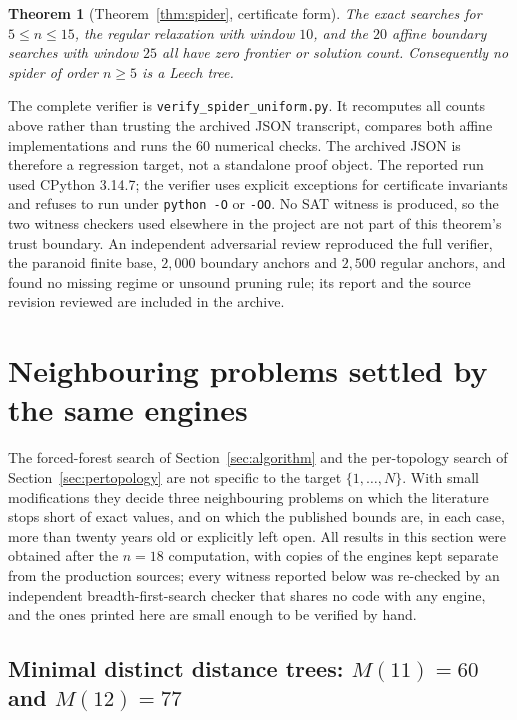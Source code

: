 \documentclass[11pt,a4paper]{article}
\theoremstyle{plain}
\newtheorem{theorem}{Theorem}[section]
\theoremstyle{remark}
\newcommand{\file}[1]{\texttt{#1}}
\begin{document}
\begin{theorem}[Theorem~\ref{thm:spider}, certificate form]
\label{thm:spiderquant}
The exact searches for $5\le n\le15$, the regular relaxation with window $10$,
and the $20$ affine boundary searches with window $25$ all have zero frontier
or solution count.  Consequently no spider of order $n\ge5$ is a Leech tree.
\end{theorem}

The complete verifier is \file{verify\_spider\_uniform.py}.  It recomputes all
counts above rather than trusting the archived JSON transcript, compares both
affine implementations and runs the $60$ numerical checks.  The archived JSON
is therefore a regression target, not a standalone proof object.  The reported
run used CPython 3.14.7; the verifier uses explicit exceptions for certificate
invariants and refuses to run under \file{python -O} or \file{-OO}.  No SAT
witness is produced, so the two witness checkers used elsewhere in the project
are not part of this theorem's trust boundary.  An independent adversarial
review reproduced the full verifier, the paranoid finite base, $2{,}000$
boundary anchors and $2{,}500$ regular anchors, and found no missing regime or
unsound pruning rule; its report and the source revision reviewed are included
in the archive.

\section{Neighbouring problems settled by the same engines}\label{sec:variants}

The forced-forest search of Section~\ref{sec:algorithm} and the per-topology
search of Section~\ref{sec:pertopology} are not specific to the target
$\{1,\dots,N\}$.  With small modifications they decide three neighbouring
problems on which the literature stops short of exact values, and on which
the published bounds are, in each case, more than twenty years old or explicitly
left open.  All results in this section were obtained after the $n=18$
computation, with copies of the engines kept separate from the production
sources; every witness reported below was re-checked by an independent
breadth-first-search checker that shares no code with any engine, and the ones
printed here are small enough to be verified by hand.

\subsection{Minimal distinct distance trees:
  \texorpdfstring{$M(11)=60$ and $M(12)=77$}{M(11) = 60 and M(12) = 77}}
\label{sec:mdd}
\end{document}
